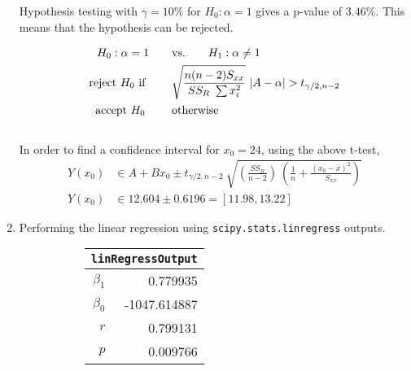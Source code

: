 \begin{enumerate}
\begin{figure}[H]
\begin{subfigure}[]{0.8\linewidth}
	\end{subfigure}
\end{figure}

Hypothesis testing with $ \gamma = 10\% $ for $ H_0 : \alpha = 1 $ gives a p-value of $ 3.46\% $. This means that the hypothesis can be rejected.

\begin{align}
	H_0 : \alpha = 1 \qquad &\text{vs.} \qquad H_1 : \alpha \neq 1 \nonumber \\
	\text{reject $ H_0 $ if } \qquad & \sqrt{\frac{n(n-2) S_{xx}}{SS_R\ \sum x_i^2}}\ |A - \alpha| > t_{\gamma/2, n-2} \nonumber \\
	\text{accept $ H_0 $  } \qquad & \text{otherwise}
\end{align}\\

In order to find a confidence interval for $ x_0 = 24 $, using the above t-test, \\

\begin{align}
	Y(x_0) &\in A + B x_0 \pm t_{\gamma/2, n-2}\ \sqrt{\left(\frac{SS_R}{n-2}\right)\ \left(\frac{1}{n} + \frac{(x_0  - \overline{x})^2}{S_{xx}}\right)} \nonumber \\
	Y(x_0) &\in 12.604 \pm 0.6196 = [11.98, 13.22]
\end{align}

\item Performing the linear regression using \texttt{scipy.stats.linregress} outputs. \\

\begin{figure}[H]
	\begin{subfigure}[]{0.2\linewidth}
		\centering
		\begin{tabular}{@{}rr@{}}
			\toprule
			\multicolumn{2}{c}{\texttt{linRegressOutput}} \\
			\midrule
			$\beta_1$     &         0.779935 \\
			$\beta_0$ &     -1047.614887 \\
			$r$    &         0.799131 \\
			$p$    &         0.009766 \\
			\bottomrule
		\end{tabular}
		

\end{subfigure}
\end{figure}
\end{enumerate}
